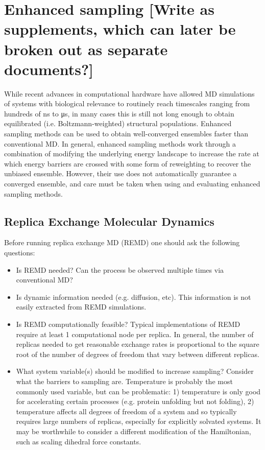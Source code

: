 \section{Enhanced sampling [Write as supplements, which can later be broken out as separate documents?]}

While recent advances in computational hardware have allowed MD simulations of systems with biological relevance to routinely reach timescales ranging from hundreds of \si{\nano\second} to \si{\micro\second}, in many cases this is still not long enough to obtain equilibrated (i.e. Boltzmann-weighted) structural populations. Enhanced sampling methods can be used to obtain well-converged ensembles faster than conventional MD. In general, enhanced sampling methods work through a combination of modifying the underlying energy landscape to increase the rate at which energy barriers are crossed with some form of reweighting to recover the unbiased ensemble. However, their use does not automatically guarantee a converged ensemble, and care must be taken when using and evaluating enhanced sampling methods.

\subsection{Replica Exchange Molecular Dynamics}
Before running replica exchange MD (REMD)\cite{Sugita1999} one should ask the following questions:
\begin{itemize}
  \item Is REMD needed? Can the process be observed multiple times via conventional MD?
  \item Is dynamic information needed (e.g. diffusion, etc). This information is not easily extracted from REMD simulations.
  \item Is REMD computationally feasible? Typical implementations of REMD require at least 1 computational node per replica. In general, the number of replicas needed to get reasonable exchange rates is proportional to the square root of the number of degrees of freedom that vary between different replicas.
  \item What system variable(s) should be modified to increase sampling? Consider what the barriers to sampling are. Temperature is probably the most commonly used variable, but can be problematic: 1) temperature is only good for accelerating certain processes (e.g. protein unfolding but not folding), 2) temperature affects all degrees of freedom of a system and so typically requires large numbers of replicas, especially for explicitly solvated systems. It may be worthwhile to consider a different modification of the Hamiltonian, such as scaling dihedral force constants.
\end{itemize}

